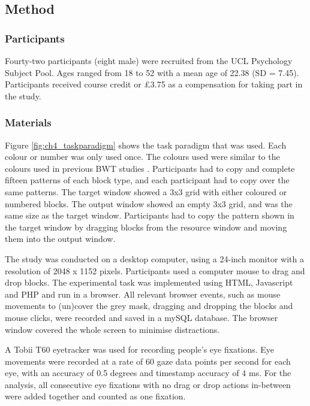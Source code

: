 \subsection{Method}
\subsubsection{Participants}
Fourty-two participants (eight male) were recruited from the UCL Psychology Subject Pool. Ages ranged from 18 to 52 with a mean age of 22.38 (SD = 7.45). Participants received course credit or \pounds3.75 as a compensation for taking part in the study.

\subsubsection{Materials}
Figure \ref{fig:ch4_taskparadigm} shows the task paradigm that was used. Each colour or number was only used once. The colours used were similar to the colours used in previous BWT studies \citep[e.g.][]{Gray2006, Morgan2009}.
Participants had to copy and complete fifteen patterns of each block type, and each participant had to copy over the same patterns. The target window showed a 3x3 grid with either coloured or numbered blocks. The output window showed an empty 3x3 grid, and was the same size as the target window. Participants had to copy the pattern shown in the target window by dragging blocks from the resource window and moving them into the output window. 

The study was conducted on a desktop computer, using a 24-inch monitor with a resolution of 2048 x 1152 pixels. Participants used a computer mouse to drag and drop blocks. The experimental task was implemented using HTML, Javascript and PHP and run in a browser.  All relevant browser events, such as mouse movements to (un)cover the grey mask, dragging and dropping the blocks and mouse clicks, were recorded and saved in a mySQL database. The browser window covered the whole screen to minimise distractions.

A Tobii T60 eyetracker was used for recording people's eye fixations. Eye movements were recorded at a rate of 60 gaze data points per second for each eye, with an accuracy of 0.5 degrees and timestamp accuracy of 4 ms. For the analysis, all consecutive eye fixations with no drag or drop actions in-between were added together and counted as one fixation.

